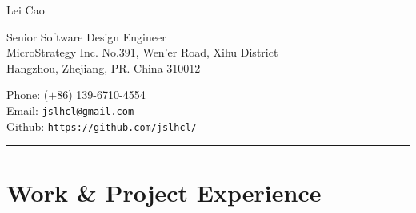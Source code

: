 \documentclass[letterpaper]{article}
\def\name{Lei Cao}
\begin{document}
{\huge \name}


\vspace{0.2in}
\begin{minipage}{0.55\linewidth}
  Senior Software Design Engineer \\
  MicroStrategy Inc.
  No.391, Wen'er Road, Xihu District\\
  Hangzhou, Zhejiang, PR. China 310012
\end{minipage}
\vspace{0.2in}
\begin{minipage}{0.40\linewidth}
  Phone: ($+$86) 139-6710-4554 \\
  Email: \href{mailto:jslhcl@gmail.com}{\tt jslhcl@gmail.com} \\
  Github: \href{https://github.com/jslhcl/}{\tt https://github.com/jslhcl/} 
\end{minipage}

\rule{16.8cm}{0.1em}

\vspace{-1.5em}
\section*{Work \& Project Experience}
\end{document}
